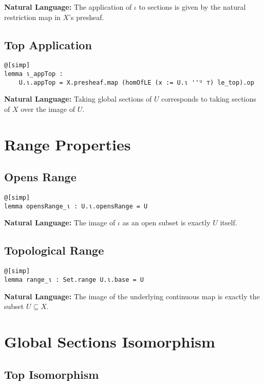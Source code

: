 \documentclass{article}
\theoremstyle{definition}
\begin{document}
\textbf{Natural Language:} The application of $\iota$ to sections is given by the natural restriction map in $X$'s presheaf.

\subsection{Top Application}

\begin{lstlisting}
@[simp]
lemma ι_appTop :
    U.ι.appTop = X.presheaf.map (homOfLE (x := U.ι ''ᵁ ⊤) le_top).op
\end{lstlisting}

\textbf{Natural Language:} Taking global sections of $U$ corresponds to taking sections of $X$ over the image of $U$.

\section{Range Properties}

\subsection{Opens Range}

\begin{lstlisting}
@[simp]
lemma opensRange_ι : U.ι.opensRange = U
\end{lstlisting}

\textbf{Natural Language:} The image of $\iota$ as an open subset is exactly $U$ itself.

\subsection{Topological Range}

\begin{lstlisting}
@[simp]
lemma range_ι : Set.range U.ι.base = U
\end{lstlisting}

\textbf{Natural Language:} The image of the underlying continuous map is exactly the subset $U \subseteq X$.

\section{Global Sections Isomorphism}

\subsection{Top Isomorphism}
\end{document}
